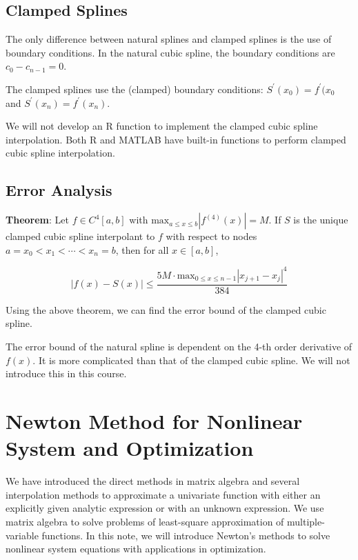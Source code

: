 \documentclass[
]{book}
\begin{document}
\hfill\break

\hypertarget{clamped-splines}{%
\section{Clamped Splines}\label{clamped-splines}}

The only difference between natural splines and clamped splines is the use of boundary conditions. In the natural cubic spline, the boundary conditions are \(c_0 -c_{n-1} = 0\).

The clamped splines use the (clamped) boundary conditions: \(S^\prime(x_0) = f^\prime(x_0\) and \(S^\prime(x_n) = f^\prime(x_n)\).

We will not develop an R function to implement the clamped cubic spline interpolation. Both R and MATLAB have built-in functions to perform clamped cubic spline interpolation.

\hfill\break

\hypertarget{error-analysis-7}{%
\section{Error Analysis}\label{error-analysis-7}}

\textbf{Theorem}: Let \(f \in C^4[a,b]\) with \(\text{max}_{ a\le x \le b} |f^{(4)}(x)| = M\). If \(S\) is the unique clamped cubic spline interpolant to \(f\) with respect to nodes \(a = x_0 < x_1 < \cdots < x_n = b\), then for all \(x \in [a, b]\),

\[
|f(x) - S(x)| \le \frac{5M \cdot \text{max}_{0 \le x \le n-1} |x_{j+1} - x_j|^4}{384}
\]

Using the above theorem, we can find the error bound of the clamped cubic spline.

The error bound of the natural spline is dependent on the 4-th order derivative of \(f(x)\). It is more complicated than that of the clamped cubic spline. We will not introduce this in this course.

\hypertarget{newton-method-for-nonlinear-system-and-optimization}{%
\chapter{Newton Method for Nonlinear System and Optimization}\label{newton-method-for-nonlinear-system-and-optimization}}

We have introduced the direct methods in matrix algebra and several
interpolation methods to approximate a univariate function with either
an explicitly given analytic expression or with an unknown expression.
We use matrix algebra to solve problems of least-square approximation of
multiple-variable functions. In this note, we will introduce Newton's
methods to solve nonlinear system equations with applications in
optimization.
\end{document}
